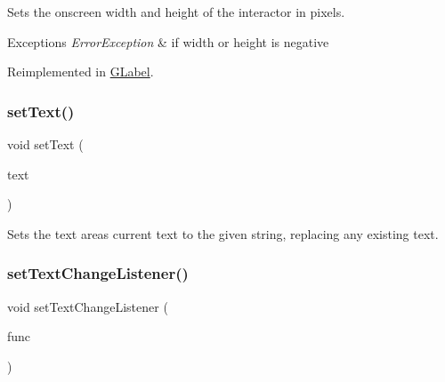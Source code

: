 Sets the onscreen width and height of the interactor in pixels. 


\begin{DoxyExceptions}{Exceptions}
{\em Error\+Exception} & if width or height is negative \\
\hline
\end{DoxyExceptions}


Reimplemented in \mbox{\hyperlink{classsgl_1_1GLabel_a42d96e60c62d7770993327d7147d77b8}{G\+Label}}.

\mbox{\label{classsgl_1_1GTextArea_ac1ae51949d41ee9054634be5967d91b8}} 
\subsubsection{\texorpdfstring{set\+Text()}{setText()}}
{\footnotesize\ttfamily void set\+Text (\begin{DoxyParamCaption}\item[{const std\+::string \&}]{text }\end{DoxyParamCaption})\hspace{0.3cm}{\ttfamily [virtual]}}



Sets the text area\textquotesingle{}s current text to the given string, replacing any existing text. 

\mbox{\label{classsgl_1_1GTextArea_ae41284f9c540110180ac0ad6beca5cb0}} 
\subsubsection{\texorpdfstring{set\+Text\+Change\+Listener()}{setTextChangeListener()}\hspace{0.1cm}{\footnotesize\ttfamily [1/2]}}
{\footnotesize\ttfamily void set\+Text\+Change\+Listener (\begin{DoxyParamCaption}\item[{\mbox{\hyperlink{namespacesgl_ae9f3e9eab70035da1a2b114e21357b25}{G\+Event\+Listener}}}]{func }\end{DoxyParamCaption})\hspace{0.3cm}{\ttfamily [virtual]}}



